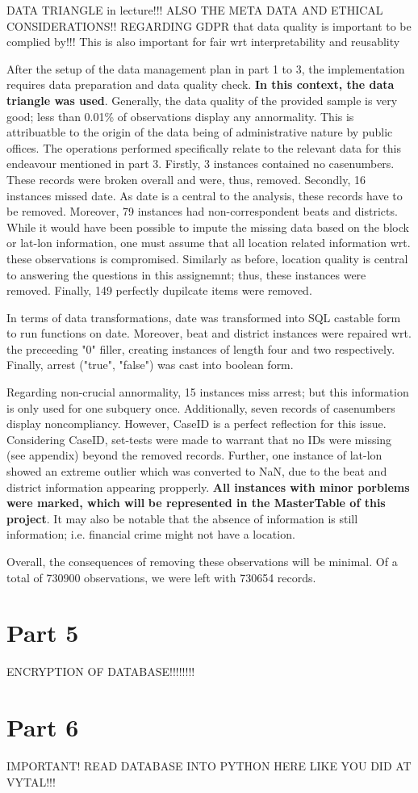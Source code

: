 \documentclass[a4paper]{article}
\begin{document}
DATA TRIANGLE in lecture!!!
ALSO THE META DATA AND ETHICAL CONSIDERATIONS!! REGARDING GDPR that data quality is important to be complied by!!! This is also important for fair wrt interpretability and reusablity


After the setup of the data management plan in part 1 to 3, the implementation requires data preparation and data quality check. \textbf{In this context, the data triangle was used}. Generally, the data quality of the provided sample is very good; less than 0.01\% of observations display any annormality. This is attribuatble to the origin of the data being of administrative nature by public offices.
\indent The operations performed specifically relate to the relevant data for this endeavour mentioned in part 3. Firstly, 3 instances contained no casenumbers. These records were broken overall and were, thus, removed. Secondly, 16 instances missed date. As date is a central to the analysis, these records have to be removed. Moreover, 79 instances had non-correspondent beats and districts. While it would have been possible to impute the missing data based on the block or lat-lon information, one must assume that all location related information wrt. these observations is compromised. Similarly as before, location quality is central to answering the questions in this assignemnt; thus, these instances were removed. Finally, 149 perfectly dupilcate items were removed. 

\indent In terms of data transformations, date was transformed into SQL castable form to run functions on date. Moreover, beat and district instances were repaired wrt. the preceeding "0" filler, creating instances of length four and two respectively. Finally, arrest ("true", "false") was cast into boolean form. 

\indent Regarding non-crucial annormality, 15 instances miss arrest; but this information is only used for one subquery once. Additionally, seven records of casenumbers display noncompliancy. However, CaseID is a perfect reflection for this issue. Considering CaseID, set-tests were made to warrant that no IDs were missing (see appendix) beyond the removed records. Further, one instance of lat-lon showed an extreme outlier which was converted to NaN, due to the beat and district information appearing propperly.\textbf{ All instances with minor porblems were marked, which will} \textbf{be represented in the MasterTable of this project}. It may also be notable that the absence of information is still information; i.e. financial crime might not have a location. 

Overall, the consequences of removing these observations will be minimal. Of a total of 730900 observations, we were left with 730654 records. 




\section{Part 5}
ENCRYPTION OF DATABASE!!!!!!!!





\section{Part 6}
IMPORTANT! READ DATABASE INTO PYTHON HERE LIKE YOU DID AT VYTAL!!!
\end{document}
